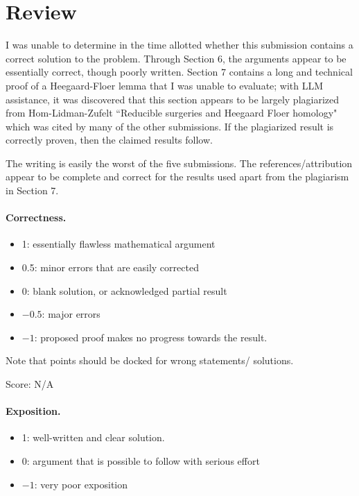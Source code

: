 \documentclass[11pt]{article}
\theoremstyle{definition}
\begin{document}
\maketitle

\section{Review}

I was unable to determine in the time allotted whether this submission contains a correct solution to the problem. Through Section 6, the arguments appear to be essentially correct, though poorly written. Section 7 contains a long and technical proof of a Heegaard-Floer lemma that I was unable to evaluate; with LLM assistance, it was discovered that this section appears to be largely plagiarized from Hom-Lidman-Zufelt ``Reducible surgeries and Heegaard Floer homology" which was cited by many of the other submissions. If the plagiarized result is correctly proven, then the claimed results follow.

The writing is easily the worst of the five submissions. The references/attribution appear to be complete and correct for the results used apart from the plagiarism in Section 7.

\paragraph{Correctness.}
\begin{itemize}
	\item  1: essentially flawless mathematical argument
	\item  0.5: minor errors that are easily corrected
	\item  0: blank solution, or acknowledged partial result
	\item  $-0.5$: major errors
	\item  $-1$: proposed proof makes no progress towards the result.
\end{itemize}
Note that points should be docked for wrong statements/ solutions.

\noindent Score: N/A

\paragraph{Exposition.}
\begin{itemize}
	\item  1: well-written and clear solution.
	\item  0: argument that is possible to follow with serious effort
	\item  $-1$: very poor exposition
\end{itemize}
\end{document}
